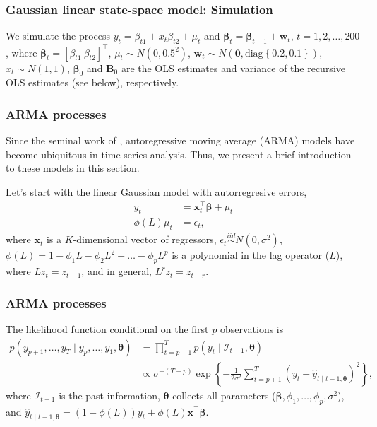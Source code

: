 \documentclass[12pt, compress]{beamer}
\begin{document}
\begin{frame}
	\frametitle{Gaussian linear state-space model: Simulation}
We simulate the process $y_t=\beta_{t1}+{x}_t{\beta}_{t2}+\mu_t$ and $\bm{\beta}_t=\bm{\beta}_{t-1}+\bm{w}_t$, $t=1,2,\dots,200$, where $\bm{\beta}_t=[\beta_{t1} \ {\beta}_{t2}]^{\top}$, $\mu_t\sim N(0,0.5^2)$, $\bm{w}_t\sim N(\bm{0},\text{diag}\left\{0.2,0.1\right\})$, $x_t\sim N(1, 1)$, $\bm{\beta}_0$ and $\bm{B}_0$ are the OLS estimates and variance of the recursive OLS estimates (see below), respectively.

\end{frame}

\begin{frame}
	\frametitle{ARMA processes}
Since the seminal work of \cite{box_jenkins_1976}, autoregressive moving average (ARMA) models have become ubiquitous in time series analysis. Thus, we present a brief introduction to these models in this section.

Let's start with the linear Gaussian model with autorregresive errors,
\begin{align}
	y_t & = \bm{x}_t^{\top}\bm{\beta}+\mu_t\label{eq1}\\
	\phi(L)\mu_t & = \epsilon_t \label{eq2}, 
\end{align}
where $\bm{x}_t$ is a $K$-dimensional vector of regressors, $\epsilon_t \stackrel{iid}{\sim} N(0,\sigma^2)$, $\phi(L)=1-\phi_1L-\phi_2L^2-\dots-\phi_pL^p$ is a polynomial in the lag operator ($L$), where $Lz_t=z_{t-1}$, and in general, $L^rz_t=z_{t-r}$.
\end{frame}

\begin{frame}
	\frametitle{ARMA processes}
The likelihood function conditional on the first $p$ observations is
{\footnotesize{
\begin{align*}
	p(y_{p+1},\dots,y_T\mid y_{p},\dots,y_1,\bm{\theta})&=\prod_{t=p+1}^{T}p(y_t\mid \mathcal{I}_{t-1},\bm{\theta})\\
	&\propto \sigma^{-(T-p)}\exp\left\{-\frac{1}{2\sigma^2}\sum_{t=p+1}^T(y_t-\hat{y}_{t\mid t-1,\bm{\theta}})^2\right\},
\end{align*} 
}}
where $\mathcal{I}_{t-1}$ is the past information, $\bm{\theta}$ collects all parameters ($\bm{\beta}, \phi_1,\dots,\phi_p, \sigma^2$), and $\hat{y}_{t\mid t-1,\bm{\theta}}=(1-\phi(L))y_t+\phi(L)\bm{x}^{\top}\bm{\beta}$.

\end{frame}
\end{document}
